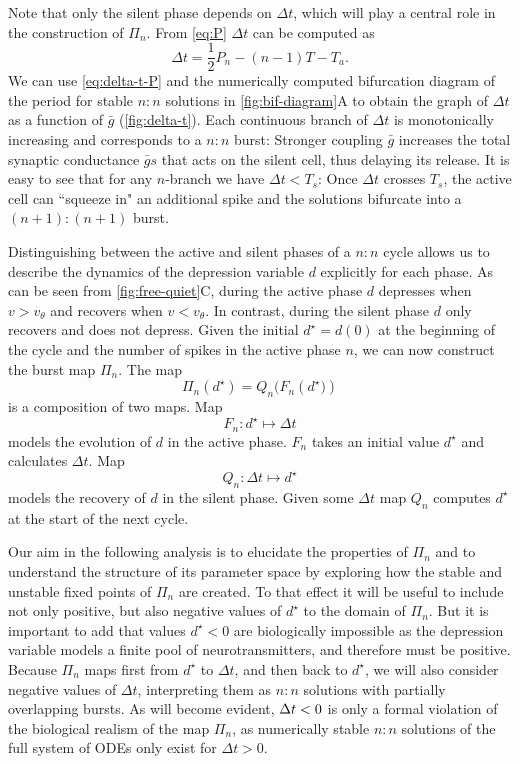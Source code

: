 Note that only the silent phase depends on $\Delta t$, which will play a central role in the construction of $\Pi_n$.
From \cref{eq:P} $\Delta t$ can be computed as
\begin{equation}
	\label{eq:delta-t-P}
	\Delta t = \frac{1}{2}P_n - (n-1)T - T_{a}.
\end{equation}
We can use \cref{eq:delta-t-P} and the numerically computed bifurcation diagram of the period for stable $n:n$ solutions in \cref{fig:bif-diagram}A to obtain the graph of $\Delta t$ as a function of $\bar g$ (\cref{fig:delta-t}).
Each continuous branch of $\Delta t$ is monotonically increasing and corresponds to a $n:n$ burst:
Stronger coupling $\bar g$ increases the total synaptic conductance $\bar g s$ that acts on the silent cell, thus delaying its release.
It is easy to see that for any $n$-branch we have $\Delta t < T_{s}$:
Once $\Delta t$ crosses $T_{s}$, the active cell can ``squeeze in" an additional spike and the solutions bifurcate into a $(n+1):(n+1)$ burst.

Distinguishing between the active and silent phases of a $n:n$ cycle allows us to describe the dynamics of the depression variable $d$ explicitly for each phase.
As can be seen from \cref{fig:free-quiet}C, during the active phase $d$ depresses when $v > v_\theta$ and recovers when $v < v_\theta$.
In contrast, during the silent phase $d$ only recovers and does not depress.
Given the initial $d^{\star} = d(0)$ at the beginning of the cycle and the number of spikes in the active phase $n$, we can now construct the burst map $\Pi_n$.
The map
\begin{equation}
	\Pi_n(d^\star)=Q_n\big(F_n(d^\star\big))
\end{equation}
\noindent
is a composition of two maps. Map
\begin{equation}
	F_n:d^\star\mapsto \Delta t
\end{equation}
models the evolution of $d$ in the active phase.
$F_n$ takes an initial value $d^{\star}$ and calculates $\Delta t$.
Map
\begin{equation}
	Q_n:\Delta t \mapsto d^{\star}
\end{equation}
models the recovery of $d$ in the silent phase.
Given some $\Delta t$ map $Q_n$ computes $d^\star$ at the start of the next cycle.

Our aim in the following analysis is to elucidate the properties of $\Pi_n$ and to understand the structure of its parameter space by exploring how the stable and unstable fixed points of $\Pi_{n}$ are created.
To that effect it will be useful to include not only positive, but also negative values of $d^{\star}$ to the domain of $\Pi_{n}$.
But it is important to add that values $d^{\star}<0$ are biologically impossible as the depression variable models a finite pool of neurotransmitters, and therefore must be positive.
Because $\Pi_{n}$ maps first from $d^{\star}$ to $\Delta t$, and then back to $d^{\star}$, we will also consider negative values of $\Delta t$, interpreting them as $n:n$ solutions with partially overlapping bursts.
As will become evident, $\Delta t<0$ is only a formal violation of the biological realism of the map $\Pi_{n}$, as numerically stable $n:n$ solutions of the full system of ODEs only exist for $\Delta t>0$.

